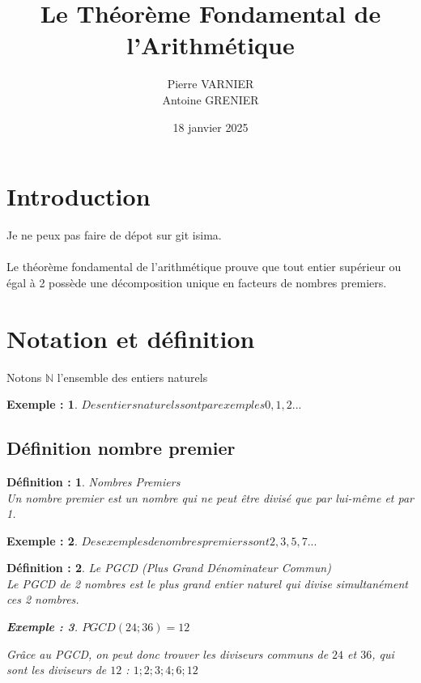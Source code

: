 \documentclass[titlepage]{article}
\title{Le Théorème Fondamental de l'Arithmétique}
\author{Pierre VARNIER \\ Antoine GRENIER}
\date{18 janvier 2025}
\newtheorem{exemple}{Exemple :}
\newtheorem{definiton}{Définition :}
\begin{document}
\maketitle
\tableofcontents
\newpage
\section{Introduction}

Je ne peux pas faire de dépot sur git isima.
\\
\\
\hspace{1 cm} Le théorème fondamental de l'arithmétique prouve que tout entier supérieur ou égal à 2 possède une décomposition unique en facteurs de nombres premiers.

\section{Notation et définition}

\hspace{1 cm} Notons $\mathbb{N}$ l'ensemble des entiers naturels 
\begin{exemple}
$Des entiers naturels sont par exemples 0,1,2...$
\end{exemple}

\subsection{Définition nombre premier}

\begin{definiton}Nombres Premiers \\
Un nombre premier est un nombre qui ne peut être divisé que par lui-même et par 1.
\end{definiton}

\begin{exemple}
$Des exemples de nombres premiers sont 2,3,5,7...$
\end{exemple}

\begin{definiton}Le PGCD (Plus Grand Dénominateur Commun)\\
Le PGCD de 2 nombres est le plus grand entier naturel qui divise simultanément ces 2 nombres.

\begin{exemple}
$PGCD(24 ; 36) = 12 $
\end{exemple}
Grâce au PGCD, on peut donc trouver les diviseurs communs de $24$ et $36$, qui sont les diviseurs de $12$ : $1 ; 2 ; 3 ; 4 ; 6 ; 12$
\end{definiton}
\end{document}

